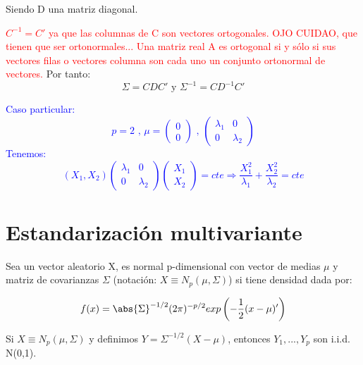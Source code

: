 \documentclass[nochap]{apuntes}
\begin{document}
Siendo D una matriz diagonal.

\textcolor{red}{$C^{-1}=C'$ ya que las columnas de C son vectores ortogonales. OJO CUIDAO, que tienen que ser ortonormales...
Una matriz real A es ortogonal si y sólo si sus vectores filas o vectores columna son cada uno un conjunto ortonormal de vectores.}
Por tanto:
\[
\Sigma = CDC'  \text{ y } \Sigma^{-1} = CD^{-1}C'
\]

\textcolor{blue}{Caso particular:
\[
p=2 \text{ , }
\mu=\left(
\begin{array}{c}
0\\
0
\end{array}
\right)
\text{ , }
\left(
\begin{array}{cc}
\lambda_1& 0 \\
0 & \lambda_2
\end{array}
\right)
\]
Tenemos:
\[
(X_1, X_2)
\left(
\begin{array}{cc}
\lambda_1& 0 \\
0 & \lambda_2
\end{array}
\right)
\left(
\begin{array}{c}
X_1\\
X_2
\end{array}
\right) = cte
\Rightarrow
\frac{X_1^2}{\lambda_1}+\frac{X_2^2}{\lambda_2}=cte
\]
}


\section{Estandarización multivariante}
\begin{defn}
Sea un vector aleatorio X, es normal p-dimensional con vector de medias $\mu$ y matriz de covarianzas $\Sigma$ (notación: $X\equiv N_p(\mu, \Sigma)$) si tiene densidad dada por:

\[
f(x)=\abs{\Sigma}^{-1/2}(2\pi)^{-p/2} exp \left( -\frac{1}{2}(x-\mu)' \right)
\]
\end{defn}

\begin{prop} Si $X \equiv N_p(\mu, \Sigma)$ y definimos $Y = \Sigma^{-1/2}(X-\mu)$, entonces $Y_1,...,Y_p$ son i.i.d. N(0,1).\end{prop}
\end{document}
